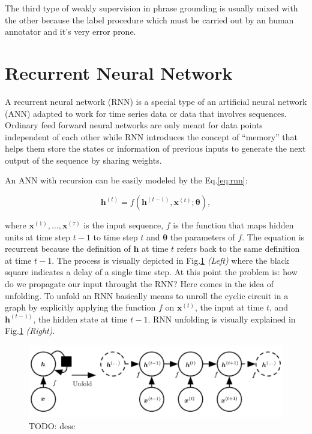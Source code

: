 The third type of weakly supervision in phrase grounding is usually
mixed with the other because the label procedure which must be carried
out by an human annotator and it's very error prone.

\section{Recurrent Neural Network}

A recurrent neural network (RNN) is a special type of an artificial
neural network (ANN) adapted to work for time series data or data that
involves sequences. Ordinary feed forward neural networks are only
meant for data points independent of each other while RNN introduces
the concept of ``memory'' that helps them store the states or
information of previous inputs to generate the next output of the
sequence by sharing weights.

An ANN with recursion can be easily modeled by the Eq.\ref{eq:rnn}:

\begin{equation}
  \label{eq:rnn}
  \bm{h}^{(t)} = f ( \bm{h}^{(t - 1)}, \bm{x}^{(t)} ; \bm{\theta} ),
\end{equation}

where $\bm{x}^{(1)}, \ldots, \bm{x}^{(\tau)}$ is the input sequence,
$f$ is the function that maps hidden units at time step $t - 1$ to
time step $t$ and $\bm{\theta}$ the parameters of $f$. The equation is
recurrent because the deﬁnition of $\bm{h}$ at time $t$ refers back to
the same deﬁnition at time $t - 1$. The process is visually depicted
in Fig.\ref{fig:rnn-with-unfold} \emph{(Left)} where the black square
indicates a delay of a single time step. At this point the problem is:
how do we propagate our input throught the RNN? Here comes in the idea
of unfolding. To unfold an RNN basically means to unroll the cyclic
circuit in a graph by explicitly applying the function $f$ on
$\bm{x}^{(t)}$, the input at time $t$, and $\bm{h}^{(t-1)}$, the
hidden state at time $t - 1$. RNN unfolding is visually explained in
Fig.\ref{fig:rnn-with-unfold} \emph{(Right)}.

\begin{figure}
  \centering
  \includegraphics[width=.8\textwidth]{figures/rnn-with-unfold.png}
  \caption[TODO]{TODO: desc}
  \label{fig:rnn-with-unfold}
\end{figure}

